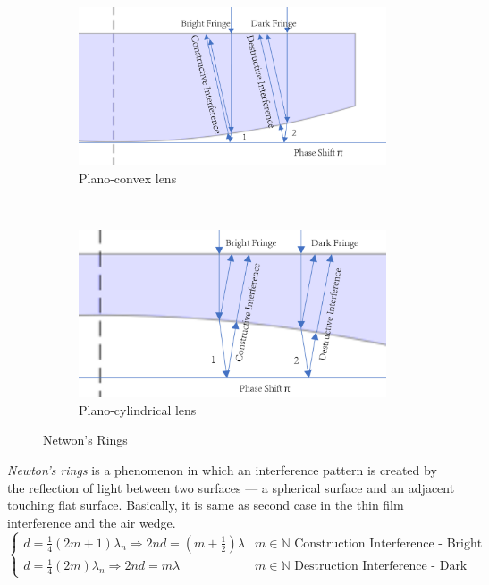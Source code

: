 \documentclass[UTF8]{book}
\begin{document}
\begin{figure}[H]
    \centering
    \begin{subfigure}[b]{0.45\textwidth}
        \includegraphics[width=\textwidth]{Figure/Air_Wedge.PNG}
        \caption{Plano-convex lens}
        \label{fig:Plano-convex lens}
    \end{subfigure}
    ~
    \begin{subfigure}[b]{0.45\textwidth}
        \includegraphics[width=\textwidth]{Figure/Air_Wedge2.PNG}
        \caption{Plano-cylindrical lens}
        \label{fig:Plano-cylindrical lens}
    \end{subfigure}
    \caption{Netwon's Rings}\label{fig:Newton's Rings}
\end{figure}
\emph{Newton's rings} is a phenomenon in which an interference pattern is created by the reflection of light between two surfaces — a spherical surface and an adjacent touching flat surface. Basically, it is same as second case in the thin film interference and the air wedge.
\[\begin{cases}
d = \frac{1}{4}(2m+1)\lambda _n\Rightarrow 2nd=\left(m+\frac{1}{2}\right)\lambda &m\in \mathbb{N} \textrm{ Construction Interference - Bright Fringe}\\
d = \frac{1}{4}(2m)\lambda _n\Rightarrow 2nd=m\lambda &m\in \mathbb{N} \textrm{ Destruction Interference  - Dark Fringe}
\end{cases}\]
\end{document}

